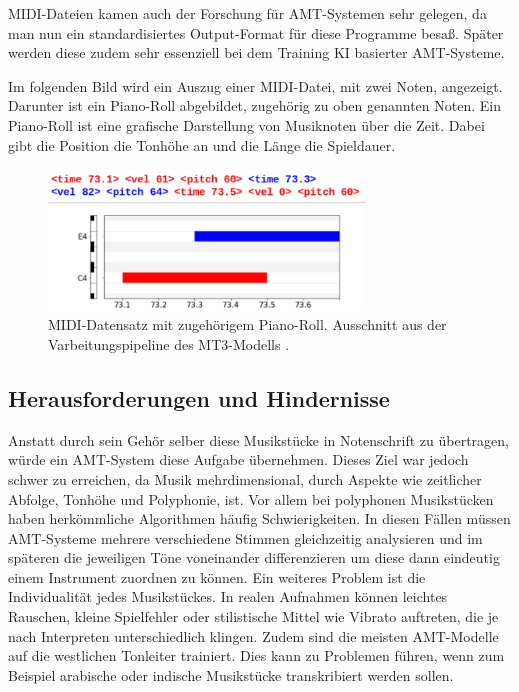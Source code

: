 \begin{description}[style=nextline]
MIDI-Dateien kamen auch der Forschung für AMT-Systemen sehr gelegen,
da man nun ein standardisiertes Output-Format für diese Programme besaß.
Später werden diese zudem sehr essenziell bei dem Training KI basierter AMT-Systeme\cite{telila2025cnn}.

Im folgenden Bild wird ein Auszug einer MIDI-Datei, mit zwei Noten, angezeigt.
Darunter ist ein Piano-Roll abgebildet, zugehörig zu oben genannten Noten.
Ein Piano-Roll ist eine grafische Darstellung von Musiknoten über die Zeit.
Dabei gibt die Position die Tonhöhe an und die Länge die Spieldauer.
\begin{figure}[H]
    \centering
    \includegraphics[width=0.75\textwidth]{Graphics/midi_pianoroll}
    \caption[MIDI-Datensatz]{MIDI-Datensatz mit zugehörigem Piano-Roll. Ausschnitt aus der Varbeitungspipeline des MT3-Modells \cite{mt3colab}.}
    \label{fig:mt3_output_tokens}
\end{figure}
\end{description}

\subsection{Herausforderungen und Hindernisse}
Anstatt durch sein Gehör selber diese Musikstücke in Notenschrift zu übertragen,
würde ein AMT-System diese Aufgabe übernehmen.
Dieses Ziel war jedoch schwer zu erreichen,
da Musik mehrdimensional, durch Aspekte wie zeitlicher Abfolge, Tonhöhe und Polyphonie, ist.
Vor allem bei polyphonen Musikstücken haben herkömmliche Algorithmen häufig Schwierigkeiten.
In diesen Fällen müssen AMT-Systeme mehrere verschiedene Stimmen gleichzeitig analysieren und
im späteren die jeweiligen Töne voneinander differenzieren um diese dann eindeutig einem Instrument zuordnen zu können.
Ein weiteres Problem ist die Individualität jedes Musikstückes.
In realen Aufnahmen können leichtes Rauschen,
kleine Spielfehler oder stilistische Mittel wie Vibrato auftreten,
die je nach Interpreten unterschiedlich klingen.
Zudem sind die meisten AMT-Modelle auf die westlichen Tonleiter trainiert.
Dies kann zu Problemen führen, wenn zum Beispiel
arabische oder indische Musikstücke transkribiert werden sollen.

